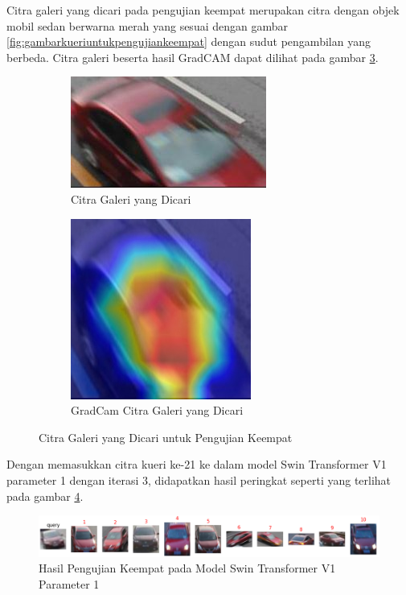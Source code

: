 Citra galeri yang dicari pada pengujian keempat merupakan citra dengan objek \linebreak mobil sedan berwarna merah 
yang sesuai dengan gambar \ref{fig:gambarkueriuntukpengujiankeempat} dengan sudut pengambilan yang berbeda. 
Citra galeri beserta hasil GradCAM dapat dilihat pada gambar \ref{fig:gambargaleriuntukpengujiankeempat}.\\

\begin{figure}[h!]
  \centering
  \begin{subfigure}{.5\textwidth}
    \centering
    \includegraphics[width=.4\linewidth]{gambar/Gal21_1046.jpg}
    \caption{Citra Galeri yang Dicari}
    \label{gambargalerinomorduasatu}
  \end{subfigure}%
  \begin{subfigure}{.5\textwidth}
    \centering
    \includegraphics[width=.4\linewidth]{gambar/GradCamGal21_1046.jpg}
    \caption{GradCam Citra Galeri yang Dicari}
    \label{gradcamgambargalerinomorduasatu}
  \end{subfigure}
  \caption{Citra Galeri yang Dicari untuk Pengujian Keempat}
  \label{fig:gambargaleriuntukpengujiankeempat}
\end{figure}

Dengan memasukkan citra kueri ke-21 ke dalam model Swin Transformer V1 parameter 1 dengan iterasi 3, didapatkan hasil 
peringkat seperti yang terlihat pada gambar \ref{fig:hasilpengujiankeempatpadamodelswintransformerv1param1}.

\begin{figure}[h!]
  \centering
  \includegraphics[scale=0.6]{gambar/Que21V1P1IT3.png}
  \caption{Hasil Pengujian Keempat pada Model Swin Transformer V1 Parameter 1}
  \label{fig:hasilpengujiankeempatpadamodelswintransformerv1param1}
\end{figure}

